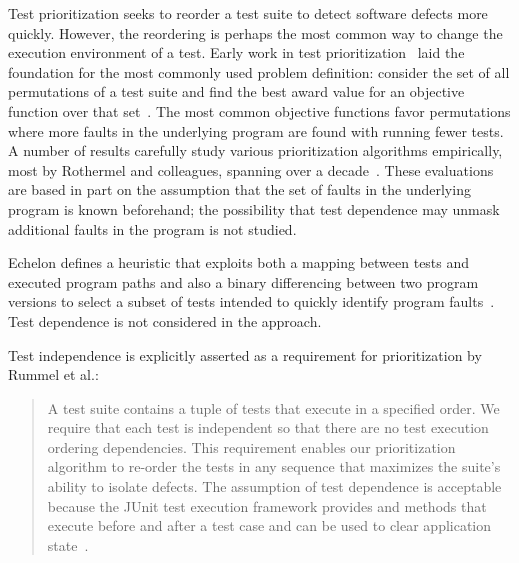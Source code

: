 Test prioritization seeks to reorder a test suite to detect
software defects more quickly. However,
the reordering is perhaps the most common way to change the
execution environment of a test. Early work in test
prioritization~\cite{Wong:1997:SER:851010.856115,Rothermel:1999:TCP:519621.853398}
laid the foundation for the most commonly used problem definition:
consider the set of all permutations of a test suite and find the best
award value for an objective function over that
set~\cite{Elbaum:2000:PTC:347324.348910}.  The most common objective
functions favor permutations where more faults in the underlying
program  are found with running fewer tests.
A number of results carefully study various prioritization algorithms
empirically, most by Rothermel and colleagues,
spanning over a decade~\cite[\emph{et
alia}]{Rothermel:1999:TCP:519621.853398,Do:2010:ETC:1907658.1908088}.  These evaluations are based in part on the assumption that the set of faults in the underlying program is known beforehand; the possibility that test dependence may unmask additional faults in the program is not studied.


Echelon defines a
heuristic that exploits both a mapping between tests and
executed program paths and also a binary differencing between two
program versions to select a subset of tests intended to quickly
identify program faults~\cite{Srivastava:2002:EPT:566172.566187}.
Test dependence is not considered in the approach.



Test independence is explicitly asserted as a requirement for
prioritization by Rummel et al.:
\begin{quote}
A test suite contains a tuple of tests  that execute in a specified order.  We require that each test is
independent so that there are no test execution ordering dependencies.  This requirement enables our prioritization algorithm to
re-order the tests in any sequence that maximizes the suite's
ability to isolate defects.  The assumption of test dependence
is acceptable because the JUnit test execution framework
provides  and  methods that execute before
and after a test case and can be used to clear application state~\cite[p.~1500]{Rummel:2005:TPR:1066677.1067016}.
\end{quote}

